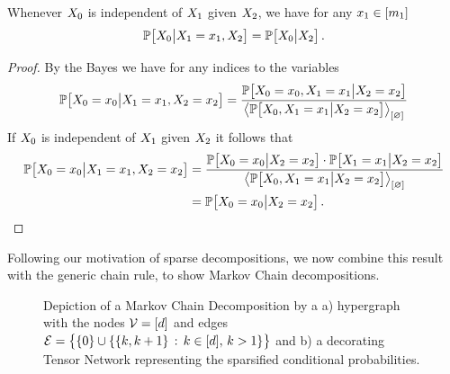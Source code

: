 \begin{theorem}
    \label{the:conditionDropping}
    Whenever $X_{0}$ is independent of $X_{1}$ given $X_{2}$, we have for any $x_{1}\in[m_{1}]$
    \begin{align*}
        \mathbb{P}\big[X_{0}\big|X_{1}=x_{1},X_{2}\big]
        = \mathbb{P}\big[X_{0}\big|X_{2}\big] \, .
    \end{align*}
\end{theorem}
\begin{proof}
    By the Bayes  we have for any indices to the variables
    \begin{align*}
        \mathbb{P}\big[X_{0}=x_{0}\big|X_{1}=x_{1},X_{2}=x_{2}\big]
        = \frac{\mathbb{P}\big[X_{0}=x_{0},X_{1}=x_{1}\big|X_{2}=x_{2}\big]}{
            \left\langle \mathbb{P}\big[X_{0},X_{1}=x_{1}\big|X_{2}=x_{2}\big]\right\rangle_{\left[ \varnothing \right]}
        }
    \end{align*}
    If $X_{0}$ is independent of $X_{1}$ given $X_{2}$ it follows that
    \begin{align*}
        \mathbb{P}\big[X_{0}=x_{0}\big|X_{1}=x_{1},X_{2}=x_{2}\big]
        & = \frac{\mathbb{P}\big[X_{0}=x_{0}\big|X_{2}=x_{2}\big] \cdot \mathbb{P}\big[X_{1}=x_{1}\big|X_{2}=x_{2}\big]}{
            \left\langle \mathbb{P}\big[X_{0},X_{1}=x_{1}\big|X_{2}=x_{2}\big]\right\rangle_{\left[ \varnothing \right]}
        } \\
        & = \mathbb{P}\big[X_{0}=x_{0}\big|X_{2}=x_{2}\big] \, . \qedhere
    \end{align*}
\end{proof}

Following our motivation of sparse decompositions, we now combine this result with the generic chain rule, to show Markov Chain decompositions.

\begin{figure}[t]
    \begin{center}
        
    \end{center}
    \caption{Depiction of a Markov Chain Decomposition by a
    a) hypergraph with the nodes $\mathcal{V}=[d]$ and edges $\mathcal{E}=\big\{\{0\}\cup\{\{k,k+1\} \,:\,k\in[d], \, k>1\} \big\}$ and
    b) a decorating Tensor Network representing the sparsified conditional probabilities.}
    \label{fig:MC}
\end{figure}

